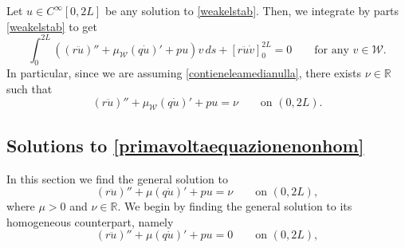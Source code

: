 \documentclass[11pt]{amsart}
\newcommand{\rr}{{\mathbb{R}}}
\theoremstyle{definition}
\theoremstyle{remark}
\numberwithin{equation}{section}
\begin{document}
Let $u \in C^\infty[0,2L]$ be any solution to \eqref{weakelstab}. Then,  we integrate by parts \eqref{weakelstab} to get
\begin{equation}\label{weakstabwithbc}
\int_0^{2L}\left(\left(r \ddot u\right)''+\mu_{\mathcal W} \left(q \dot u\right)'+pu\right)v\,ds+\left[r\ddot u\dot v\right]^{2L}_0=0\qquad \text{for any $v\in \mathcal W$}.
\end{equation}
In particular, since we are assuming \eqref{contieneleamedianulla}, there exists $\nu\in\rr$ such that 
\begin{equation}\label{primavoltaequazionenonhom}
\left(r \ddot u\right)''+\mu_{\mathcal W} \left(q \dot u\right)'+pu=\nu\qquad\text{on }(0,2L).
\end{equation}
\subsection{Solutions to \eqref{primavoltaequazionenonhom}}\label{sec_soluzioniiiiiiiiiii} In this section we find the general solution to \begin{equation}\label{secondtimenonhom}
\left(r \ddot u\right)''+\mu \left(q \dot u\right)'+pu=\nu\qquad\text{on }(0,2L),
\end{equation}
where $\mu>0$ and $\nu\in\rr$. We begin by finding the general solution to its homogeneous counterpart, namely 
\begin{equation}\label{onlyequation}
\left(r \ddot u\right)''+\mu \left(q \dot u\right)'+pu=0\qquad\text{on }(0,2L),
\end{equation}
\end{document}
